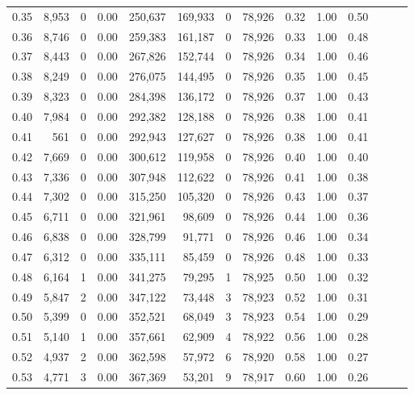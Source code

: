 \begin{tabular}{rrrrrrrrrrrrrr}
0.35 &  8,953 &      0 &  0.00 &  250,637 &  169,933 &       0 &  78,926 &  0.32 &  1.00 &      0.50 \\
0.36 &  8,746 &      0 &  0.00 &  259,383 &  161,187 &       0 &  78,926 &  0.33 &  1.00 &      0.48 \\
0.37 &  8,443 &      0 &  0.00 &  267,826 &  152,744 &       0 &  78,926 &  0.34 &  1.00 &      0.46 \\
0.38 &  8,249 &      0 &  0.00 &  276,075 &  144,495 &       0 &  78,926 &  0.35 &  1.00 &      0.45 \\
0.39 &  8,323 &      0 &  0.00 &  284,398 &  136,172 &       0 &  78,926 &  0.37 &  1.00 &      0.43 \\
0.40 &  7,984 &      0 &  0.00 &  292,382 &  128,188 &       0 &  78,926 &  0.38 &  1.00 &      0.41 \\
0.41 &    561 &      0 &  0.00 &  292,943 &  127,627 &       0 &  78,926 &  0.38 &  1.00 &      0.41 \\
0.42 &  7,669 &      0 &  0.00 &  300,612 &  119,958 &       0 &  78,926 &  0.40 &  1.00 &      0.40 \\
0.43 &  7,336 &      0 &  0.00 &  307,948 &  112,622 &       0 &  78,926 &  0.41 &  1.00 &      0.38 \\
0.44 &  7,302 &      0 &  0.00 &  315,250 &  105,320 &       0 &  78,926 &  0.43 &  1.00 &      0.37 \\
0.45 &  6,711 &      0 &  0.00 &  321,961 &   98,609 &       0 &  78,926 &  0.44 &  1.00 &      0.36 \\
0.46 &  6,838 &      0 &  0.00 &  328,799 &   91,771 &       0 &  78,926 &  0.46 &  1.00 &      0.34 \\
0.47 &  6,312 &      0 &  0.00 &  335,111 &   85,459 &       0 &  78,926 &  0.48 &  1.00 &      0.33 \\
0.48 &  6,164 &      1 &  0.00 &  341,275 &   79,295 &       1 &  78,925 &  0.50 &  1.00 &      0.32 \\
0.49 &  5,847 &      2 &  0.00 &  347,122 &   73,448 &       3 &  78,923 &  0.52 &  1.00 &      0.31 \\
0.50 &  5,399 &      0 &  0.00 &  352,521 &   68,049 &       3 &  78,923 &  0.54 &  1.00 &      0.29 \\
0.51 &  5,140 &      1 &  0.00 &  357,661 &   62,909 &       4 &  78,922 &  0.56 &  1.00 &      0.28 \\
0.52 &  4,937 &      2 &  0.00 &  362,598 &   57,972 &       6 &  78,920 &  0.58 &  1.00 &      0.27 \\
0.53 &  4,771 &      3 &  0.00 &  367,369 &   53,201 &       9 &  78,917 &  0.60 &  1.00 &      0.26 \\

\end{tabular}
